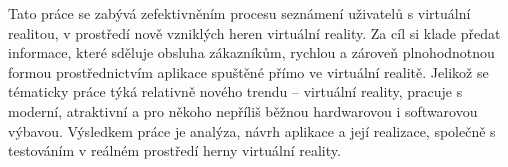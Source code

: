 Tato práce se zabývá zefektivněním procesu seznámení uživatelů s
virtuální realitou, v prostředí nově vzniklých heren virtuální reality.
Za cíl si klade předat informace, které sděluje obsluha zákazníkům,
rychlou a zároveň plnohodnotnou formou prostřednictvím aplikace spuštěné
přímo ve virtuální realitě. Jelikož se tématicky práce týká relativně
nového trendu -- virtuální reality, pracuje s moderní, atraktivní a pro
někoho nepříliš běžnou hardwarovou i softwarovou výbavou. Výsledkem
práce je analýza, návrh aplikace a její realizace, společně s testováním
v reálném prostředí herny virtuální reality.

